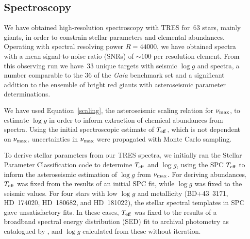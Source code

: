 \documentclass[modern]{aastex62}
\newcommand{\numax}{\mbox{$\nu_{\rm max}$}\xspace}
\newcommand{\teff}{\mbox{$T_{\rm eff}$}\xspace}
\newcommand{\logg}{\mbox{$\log g$}\xspace}
\newcommand{\gaia}{\textit{Gaia}\xspace}
\begin{document}


\subsection{Spectroscopy}
\label{spectroscopy}

We have obtained high-resolution spectroscopy with TRES for~63 stars, mainly giants, in order to constrain stellar parameters and elemental abundances. Operating with spectral resolving power $R=44 000$, we have obtained spectra with a mean signal-to-noise ratio (SNRs) of $\sim 100$  per resolution element. %
From this observing run we have~33 unique targets with seismic \logg and spectra, a number comparable to the 36 of the \gaia benchmark set \citep{2018RNAAS...2c.152J} and a significant addition to the ensemble of bright red giants with asteroseismic parameter determinations. %

We have used Equation~\ref{scaling}, the asteroseismic scaling relation for \numax \citep{1991ApJ...368..599B,KB95}, to estimate \logg in order to inform extraction of chemical abundances from spectra. Using the initial spectroscopic estimate of \teff, which is not dependent on \numax, uncertainties in \numax were propagated with Monte Carlo sampling. 

To derive stellar parameters from our TRES spectra, we initially ran the Stellar Parameter Classification code \citep[SPC:][]{spc} to determine \teff and \logg, using the SPC \teff to inform the asteroseismic estimation of \logg from \numax. For deriving abundances, \teff was fixed from the results of an initial SPC fit, while \logg was fixed to the seismic values. For four stars with low \logg and metallicity (BD+43~3171, HD~174020, HD~180682, and HD~181022), the stellar spectral templates in SPC gave unsatisfactory fits. In these cases, \teff was fixed to the results of a broadband spectral energy distribution (SED) fit to archival photometry as catalogued by \citet{Mcdonald2017}, and \logg calculated from these without iteration.
\end{document}
